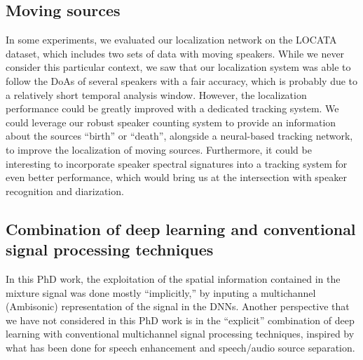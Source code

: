 \subsection{Moving sources}

In some experiments, we evaluated our localization network on the LOCATA dataset, which includes two sets of data with moving speakers. While we never consider this particular context, we saw that our localization system was able to follow the DoAs of several speakers with a fair accuracy, which is probably due to a relatively short temporal analysis window. However, the localization performance could be greatly improved with a dedicated tracking system. We could leverage our robust speaker counting system to provide an information about the sources ``birth'' or ``death'', alongside a neural-based tracking network, to improve the localization of moving sources. Furthermore, it could be interesting to incorporate speaker spectral signatures into a tracking system for even better performance, which would bring us at the intersection with speaker recognition and diarization.

\subsection{Combination of deep learning and conventional signal processing techniques}

In this PhD work, the exploitation of the spatial information contained in the mixture signal was done mostly ``implicitly,'' by inputing a multichannel (Ambisonic) representation of the signal in the DNNs. Another perspective that we have not considered in this PhD work is in the ``explicit'' combination of deep learning with conventional multichannel signal processing techniques, inspired by what has been done for speech enhancement and speech/audio source separation. 

